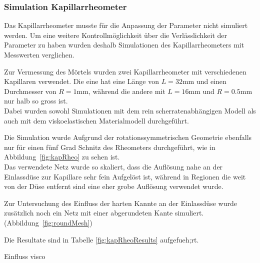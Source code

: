 \subsubsection{Simulation Kapillarrheometer}
Das Kapillarrheometer musste für die Anpassung der Parameter nicht simuliert werden. Um eine weitere Kontrollmöglichkeit über die Verlässlichkeit der Parameter zu haben wurden deshalb Simulationen des Kapillarrheometers mit Messwerten verglichen.

Zur Vermessung des Mörtels wurden zwei Kapillarrheometer mit verschiedenen Kapillaren verwendet. Die eine hat eine Länge von $L=32\mbox{mm}$ und einen Durchmesser von $R=1\mbox{mm}$, während die andere mit $L=16\mbox{mm}$ und $R=0.5\mbox{mm}$ nur halb so gross ist.\\
Dabei wurden sowohl Simulationen mit dem rein scherratenabhängigen Modell als auch mit dem viskoelastischen Materialmodell durchgeführt.

Die Simulation wurde Aufgrund der rotationssymmetrischen Geometrie ebenfalls nur für einen fünf Grad Schnitz  des Rheometers durchgeführt, wie in Abbildung~\ref{fig:kapRheo} zu sehen ist.\\
Das verwendete Netz wurde so skaliert, dass die Auflösung nahe an der Einlassdüse zur Kapillare sehr fein Aufgelöst ist, während in Regionen die weit von der Düse entfernt sind eine eher grobe Auflösung verwendet wurde.

Zur Untersuchung des Einfluss der harten Kannte an der Einlassdüse wurde zusätzlich noch ein Netz mit einer abgerundeten Kante simuliert. (Abbildung~\ref{fig:roundMesh})  

Die Resultate sind in Tabelle \ref{fig:kapRheoResults} aufgefueh;rt.

\begin{todocontent}
    \1 Einfluss visco
\end{todocontent}
%
